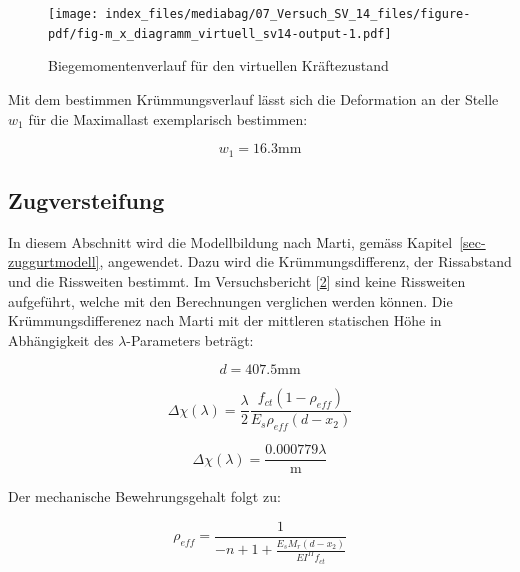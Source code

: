 \documentclass[
  12pt,
  letterpaper,
  egregdoesnotlikesansseriftitles]{scrreprt}
\begin{document}
\begin{figure}[H]

{\centering \texttt{[image: index\_files/mediabag/07\_Versuch\_SV\_14\_files/figure-pdf/fig-m\_x\_diagramm\_virtuell\_sv14-output-1.pdf]}

}

\caption{\label{fig-m_x_diagramm_virtuell_sv14}Biegemomentenverlauf für
den virtuellen Kräftezustand}

\end{figure}

Mit dem bestimmen Krümmungsverlauf lässt sich die Deformation an der
Stelle \(w_1\) für die Maximallast exemplarisch bestimmen:

\begin{equation}w_{1} = 16.3 \text{mm}\end{equation}

\hypertarget{zugversteifung-1}{%
\subsection{Zugversteifung}\label{zugversteifung-1}}

In diesem Abschnitt wird die Modellbildung nach Marti, gemäss
Kapitel~\ref{sec-zuggurtmodell}, angewendet. Dazu wird die
Krümmungsdifferenz, der Rissabstand und die Rissweiten bestimmt. Im
Versuchsbericht {[}\protect\hyperlink{ref-Tue2019}{2}{]} sind keine
Rissweiten aufgeführt, welche mit den Berechnungen verglichen werden
können. Die Krümmungsdifferenez nach Marti mit der mittleren statischen
Höhe in Abhängigkeit des \(\lambda\)-Parameters beträgt:

\begin{equation}d = 407.5 \text{mm}\end{equation}

\begin{equation}\Delta\chi{\left(\lambda \right)} = \frac{\lambda}{2} \frac{f_{ct} \left(1 - \rho_{eff}\right)}{E_{s} \rho_{eff} \left(d - x_{2}\right)}\end{equation}

\begin{equation}\Delta\chi{\left(\lambda \right)} = \frac{0.000779 \lambda}{\text{m}}\end{equation}

Der mechanische Bewehrungsgehalt folgt zu:

\begin{equation}\rho_{eff} = \frac{1}{- n + 1 + \frac{E_{s} M_{r} \left(d - x_{2}\right)}{EI^{II} f_{ct}}}\end{equation}
\end{document}
